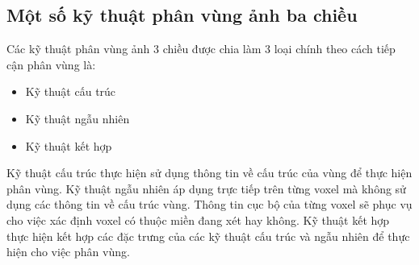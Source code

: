 \documentclass[12pt, oneside, a4]{book}
\begin{document}
\subsection{Một số kỹ thuật phân vùng ảnh ba chiều}
Các kỹ thuật phân vùng ảnh 3 chiều được chia làm 3 loại chính theo cách tiếp cận phân vùng là:
\begin{itemize}
\item Kỹ thuật cấu trúc
\item Kỹ thuật ngẫu nhiên
\item Kỹ thuật kết hợp
\end{itemize}
Kỹ thuật cấu trúc thực hiện sử dụng thông tin về cấu trúc của vùng để thực hiện phân vùng. Kỹ thuật ngẫu nhiên áp dụng trực tiếp trên từng voxel mà không sử dụng các thông tin về cấu trúc vùng. Thông tin cục bộ của từng voxel sẽ phục vụ cho việc xác định voxel có thuộc miền đang xét hay không. Kỹ thuật kết hợp thực hiện kết hợp các đặc trưng của các kỹ thuật cấu trúc và ngẫu nhiên để thực hiện cho việc phân vùng.
\end{document}
